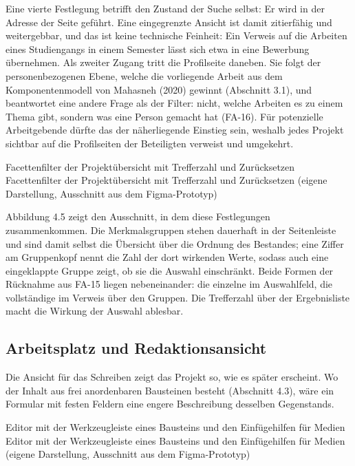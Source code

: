 Eine vierte Festlegung betrifft den Zustand der Suche selbst: Er wird in der Adresse der Seite geführt. Eine eingegrenzte Ansicht ist damit zitierfähig und weitergebbar, und das ist keine technische Feinheit: Ein Verweis auf die Arbeiten eines Studiengangs in einem Semester lässt sich etwa in eine Bewerbung übernehmen. Als zweiter Zugang tritt die Profilseite daneben. Sie folgt der personenbezogenen Ebene, welche die vorliegende Arbeit aus dem Komponentenmodell von Mahasneh (2020) gewinnt (Abschnitt 3.1), und beantwortet eine andere Frage als der Filter: nicht, welche Arbeiten es zu einem Thema gibt, sondern was eine Person gemacht hat (FA-16). Für potenzielle Arbeitgebende dürfte das der näherliegende Einstieg sein, weshalb jedes Projekt sichtbar auf die Profilseiten der Beteiligten verweist und umgekehrt.

%
{Facettenfilter der Projektübersicht mit Trefferzahl und Zurücksetzen}%
{Facettenfilter der Projektübersicht mit Trefferzahl und Zurücksetzen (eigene Darstellung, Ausschnitt aus dem Figma-Prototyp)}

Abbildung 4.5 zeigt den Ausschnitt, in dem diese Festlegungen zusammenkommen. Die Merkmalsgruppen stehen dauerhaft in der Seitenleiste und sind damit selbst die Übersicht über die Ordnung des Bestandes; eine Ziffer am Gruppenkopf nennt die Zahl der dort wirkenden Werte, sodass auch eine eingeklappte Gruppe zeigt, ob sie die Auswahl einschränkt. Beide Formen der Rücknahme aus FA-15 liegen nebeneinander: die einzelne im Auswahlfeld, die vollständige im Verweis über den Gruppen. Die Trefferzahl über der Ergebnisliste macht die Wirkung der Auswahl ablesbar.

\subsection{Arbeitsplatz und Redaktionsansicht}

Die Ansicht für das Schreiben zeigt das Projekt so, wie es später erscheint. Wo der Inhalt aus frei anordenbaren Bausteinen besteht (Abschnitt 4.3), wäre ein Formular mit festen Feldern eine engere Beschreibung desselben Gegenstands.

%
{Editor mit der Werkzeugleiste eines Bausteins und den Einfügehilfen für Medien}%
{Editor mit der Werkzeugleiste eines Bausteins und den Einfügehilfen für Medien (eigene Darstellung, Ausschnitt aus dem Figma-Prototyp)}


